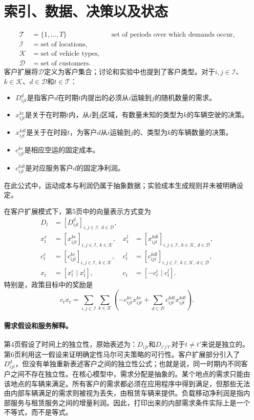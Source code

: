 \documentclass{article}
\begin{document}
\section*{索引、数据、决策以及状态}
\[
\begin{aligned}
\mathcal{T}&=\{1,\ldots,T\}&&\text{set of periods over which demands occur},\\
\mathcal{I}&=\text{set of locations},\\
\mathcal{K}&=\text{set of vehicle types},\\
\mathcal{D}&=\text{set of customers}.
\end{aligned}
\]
客户扩展将\(\mathcal{D}\)定义为客户集合；讨论和实验中也提到了客户类型。对于\(i,j\in\mathcal{I}\)、\(k\in\mathcal{K}\)、\(d\in\mathcal{D}\)和\(t\in\mathcal{T}\)：
\begin{itemize}
\item \(D_{ijt}^{d}\)是指客户\(d\)在时期\(t\)内提出的必须从\(i\)运输到\(j\)的随机数量的需求。
\item \(x_{ijt}^{ke}\)是关于在时期\(t\)内，从\(i\)到\(j\)区域，有数量未知的类型为\(k\)的车辆空驶的决策。
\item \(x_{ijt}^{kdl}\)是关于在时段\(t\)，为客户\(d\)从\(i\)运输到\(j\)的、类型为\(k\)的车辆数量的决策。
\item \(c_{ijt}^{ke}\)是相应空运的固定成本。
\item \(c_{ijt}^{kdl}\)是对应服务客户\(d\)的固定净利润。
\end{itemize}
在此公式中，运动成本与利润仍属于抽象数据；实验成本生成规则并未被明确设定。

在客户扩展模式下，第5页中的向量表示方式变为
\[
\begin{aligned}
D_t&=[D_{ijt}^{d}]_{i,j\in\mathcal{I},\ d\in\mathcal{D}},\\
x_t^e&=[x_{ijt}^{ke}]_{i,j\in\mathcal{I},\ k\in\mathcal{K}},&
x_t^l&=[x_{ijt}^{kdl}]_{i,j\in\mathcal{I},\ k\in\mathcal{K},\ d\in\mathcal{D}},\\
c_t^e&=[c_{ijt}^{ke}]_{i,j\in\mathcal{I},\ k\in\mathcal{K}},&
c_t^l&=[c_{ijt}^{kdl}]_{i,j\in\mathcal{I},\ k\in\mathcal{K},\ d\in\mathcal{D}},\\
x_t&=[x_t^e\mid x_t^l],&c_t&=[-c_t^e\mid c_t^l].
\end{aligned}
\]
特别是，政策目标中的奖励是
\[
c_tx_t=\sum_{i,j\in\mathcal{I}}\sum_{k\in\mathcal{K}}
\left(-c_{ijt}^{ke}x_{ijt}^{ke}+\sum_{d\in\mathcal{D}}c_{ijt}^{kdl}x_{ijt}^{kdl}\right).
\]

\paragraph{需求假设和服务解释。}
第4页假设了时间上的独立性，原始表述为：\(D_{ijt}\)和\(D_{i'j't'}\)对于\(t\ne t'\)来说是独立的。第6页利用这一假设来证明确定性马尔可夫策略的可行性。客户扩展部分引入了\(D_{ijt}^{d}\)，但没有单独重新表述客户之间的独立性公式；也就是说，同一时期内不同客户之间不存在独立性。在核心模型中，需求分配是抽象的。某个地点的需求只能由该地点的车辆来满足。所有客户的需求都必须在应用程序中得到满足，但那些无法由内部车辆满足的需求则被视为丢失，由租赁车辆来提供。负载移动净利润是指内部服务与租赁服务之间的增量利润。因此，打印出来的内部需求条件实际上是一个不等式，而不是等式。
\end{document}
